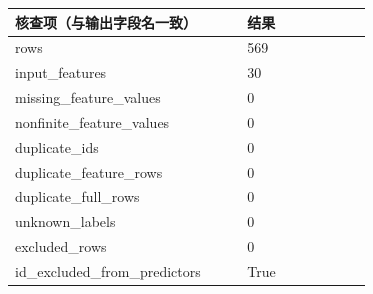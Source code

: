 \begin{center}
\small
\setlength{\tabcolsep}{5pt}
\renewcommand{\arraystretch}{1.25}
\begin{tabular}{p{0.57\linewidth}p{0.3\linewidth}}
\toprule
核查项（与输出字段名一致） & 结果 \tabularnewline
\midrule
rows & 569 \tabularnewline
input\_features & 30 \tabularnewline
missing\_feature\_values & 0 \tabularnewline
nonfinite\_feature\_values & 0 \tabularnewline
duplicate\_ids & 0 \tabularnewline
duplicate\_feature\_rows & 0 \tabularnewline
duplicate\_full\_rows & 0 \tabularnewline
unknown\_labels & 0 \tabularnewline
excluded\_rows & 0 \tabularnewline
id\_excluded\_from\_predictors & True \tabularnewline
\bottomrule
\end{tabular}
\end{center}
